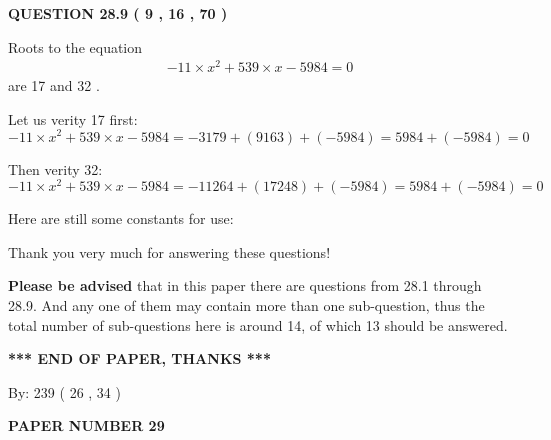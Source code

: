 \documentclass[12pt]{article}
\begin{document}
 
 
  
\vspace{0.2in}
  
{\textbf{\Large{QUESTION
28.9 
 (           9 ,          16 ,          70 )
}}}
  
  


 
 

Roots to the equation
\begin{eqnarray*}
-11 \times x^2  %
+  %
539
                 \times x    %
-5984 =0
\end{eqnarray*}
are  %
17 and  %
32 .
 
Let us verity  %
17 first:
$  %
-11 \times x^2  %
+  %
539
                 \times x    %
-5984
  = %
-3179+( %
9163)+( %
-5984)
  = %
5984+( %
-5984)
  = %
0
$
 
Then verity  %
32:
$  %
-11 \times x^2  %
+  %
539
                 \times x    %
-5984
  = %
-11264+( %
17248)+( %
-5984)
  = %
5984+( %
-5984)
  = %
0
$
 
 
 
   
   
 \vspace{0.2in}
Here are still some constants for use:
 
 
 
 
Thank you very much for answering these questions!
 
{\textbf{\large{Please be advised}}} that in this paper there are questions from
28.1 through
28.9.
And any one of them may contain more than one sub-question, thus the total number
of sub-questions here is around 14, of which
13 should be answered.
 
   
   
   
   
\vspace{1.0in} 
{\textbf{\large{ *** END OF PAPER, THANKS *** }}} 
   
   
\hspace{1.0in} By: 
         239 (          26 ,           34 )
   
   
   
   
\newpage 
\setcounter{page}{ 
    29001 } 
   
   
   
   
 {\textbf{ \Large{ PAPER NUMBER           29  }}}
   
   
\vspace{0.2in}
   
   
   
\end{document}
